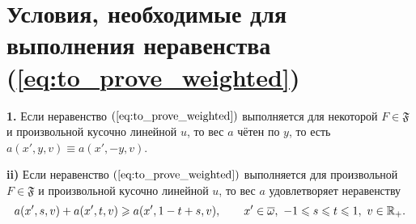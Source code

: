 \section{Условия, необходимые для выполнения неравенства (\ref{eq:to_prove_weighted})}
\label{sec:necessary_weighted}

\begin{thm}
\label{thm:necessary_conditions_weighted}
\textbf{1.}
Если неравенство $(\ref{eq:to_prove_weighted})$ выполняется для некоторой $F \in \mathfrak{F}$ и произвольной кусочно линейной $u$,
то вес $a$ чётен по $y$, то есть $a(x', y, v) \equiv a(x', -y, v)$.

\textbf{\textup{ii)}}
Если неравенство $(\ref{eq:to_prove_weighted})$ выполняется для произвольной $F \in \mathfrak{F}$
и произвольной кусочно линейной $u$, то вес $a$ удовлетворяет неравенству
\begin{equation}
\label{eq:almostConcave}
a(x', s, v) + a(x', t, v) \ge a(x', 1 - t + s, v), \qquad x' \in \overline{\omega},\ -1 \le s \le t \le 1,\ v \in \Real_+.
\end{equation}
\end{thm}

